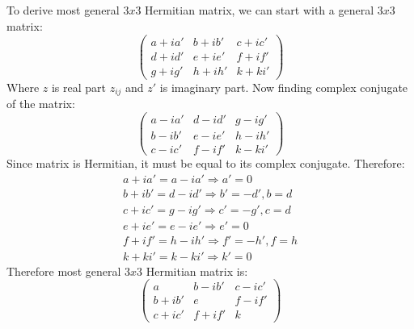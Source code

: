 \documentclass[12pt]{article}
\begin{document}
\subsection{}
To derive most general $3x3$ Hermitian matrix, we can start with a general $3x3$ matrix:
\begin{equation}
    \begin{pmatrix}
        a + ia' & b + ib'  & c + ic'\\
        d + id' & e + ie' & f + if'\\
        g + ig' & h + ih' & k + ki'
    \end{pmatrix}
\end{equation}
Where $z$ is real part $z_{ij}$ and $z'$ is imaginary part. Now finding complex conjugate of the matrix:
\begin{equation}
    \begin{pmatrix}
        a - ia' & d - id'  & g - ig'\\
        b - ib' & e - ie' & h - ih'\\
        c - ic' & f - if' & k - ki'
    \end{pmatrix}
\end{equation}
Since matrix is Hermitian, it must be equal to its complex conjugate. Therefore:
\begin{equation}
    \begin{gathered}
        a + ia' = a - ia' \Rightarrow a' = 0\\
        b + ib' = d - id' \Rightarrow b' = -d', b = d\\
        c + ic' = g - ig' \Rightarrow c' = -g', c = d\\
        e + ie' = e - ie' \Rightarrow e' = 0\\
        f + if' = h - ih' \Rightarrow f' = -h', f = h\\
        k + ki' = k - ki' \Rightarrow k' = 0
    \end{gathered}
\end{equation} 
Therefore most general $3x3$ Hermitian matrix is:
\begin{equation}
    \begin{pmatrix}
        a & b - ib'  & c - ic'\\
        b + ib' & e & f - if'\\
        c + ic' & f + if' & k
    \end{pmatrix}
\end{equation}
\end{document}
